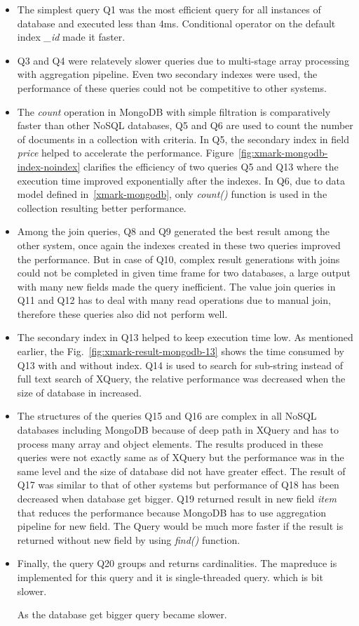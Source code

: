 \begin{itemize}
\item The simplest query Q1 was the most efficient query for all instances of database and executed less than 4ms. Conditional operator on the default index \textit{\_id} made it faster.
\item Q3 and Q4 were relatevely slower queries due to multi-stage array processing with aggregation pipeline. Even two secondary indexes were used, the performance of these queries could not be competitive to other systems. 
\item The \textit{count} operation in MongoDB with simple filtration is comparatively faster than other NoSQL databases, Q5 and Q6 are used to count the number of documents in a collection with criteria. In Q5, the secondary index in field \textit{price}  helped to accelerate the performance. Figure~\ref{fig:xmark-mongodb-index-noindex} clarifies the efficiency of two queries Q5 and Q13 where the execution time improved exponentially after the indexes. In Q6, due to data model defined in~\ref{xmark-mongodb}, only \textit{count()} function is used in the collection resulting better performance.

\item Among the join queries, Q8 and Q9 generated the best result among the other system, once again the indexes created in these two queries improved the performance. 
But in case of Q10, complex result generations with joins could not be completed in given time frame for two databases, a large output with many new fields made the query inefficient. The value join queries in Q11 and Q12 has to deal with many read operations due to manual join, therefore these queries also did not perform well.

\item The secondary index in Q13 helped to keep execution time low. As mentioned earlier, the Fig.~\ref{fig:xmark-result-mongodb-13} shows the time consumed by Q13  with and without index. Q14 is used to search for sub-string instead of full text search of XQuery, the relative performance was decreased when the size of database in increased.

\item The structures of the queries Q15 and Q16 are complex in all NoSQL databases including MongoDB because of deep path in XQuery and has to process many array and object elements. The results produced in these queries were not exactly same as of XQuery but the performance was in the same level and the size of database did not have greater effect. The result of Q17 was similar to that of other systems but performance of Q18 has been decreased when database get bigger. 
Q19 returned result in new field \textit{item} that reduces the performance because  MongoDB has to use aggregation pipeline for new field.  The Query would be much more faster if the result is returned without new field by using \textit{find()} function.
\item Finally, the query Q20 groups and returns cardinalities. The mapreduce is implemented for this query and it is single-threaded query. which is bit slower.

As the database get bigger query became slower. 
\end{itemize}
